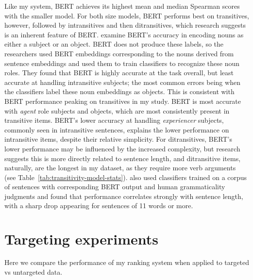 Like my system, BERT achieves its highest mean and median Spearman scores with the smaller model. For both size models, BERT performs best on transitives, however, followed by intransitives and then ditransitives, which research suggests is an inherent feature of BERT. \citet{papadimitriou2021multilingual} examine BERT's accuracy in encoding nouns as either a subject or an object. BERT does not produce these labels, so the researchers used BERT embeddings corresponding to the nouns derived from sentence embeddings and used them to train classifiers to recognize these noun roles. They found that BERT is highly accurate at the task overall, but least accurate at handling intransitive subjects; the most common errors being when the classifiers label these noun embeddings as objects. This is consistent with BERT performance peaking on transitives in my study. BERT is most accurate with \textit{agent} role subjects and objects, which are most consistently present in transitive items. BERT's lower accuracy at handling \textit{experiencer} subjects, commonly seen in intransitive sentences, explains the lower performance on intransitive items, despite their relative simplicity. For ditransitives, BERT's lower performance may be influenced by the increased complexity, but research suggests this is more directly related to sentence length, and ditransitive items, naturally, are the longest in my dataset, as they require more verb arguments (see Table~\ref{tab:transitivity-model-stats}). \citet{warstadt2019} also used classifiers trained on a corpus of sentences with corresponding BERT output and human grammaticality judgments and found that performance correlates strongly with sentence length, with a sharp drop appearing for sentences of 11 words or more.

\section{Targeting experiments}
\label{sec:exp-targeting}
Here we compare the performance of my ranking system when applied to targeted vs untargeted data.

